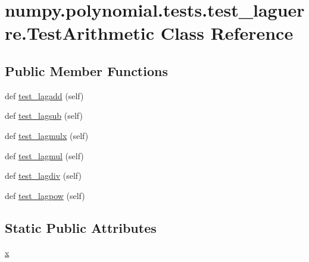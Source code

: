\hypertarget{classnumpy_1_1polynomial_1_1tests_1_1test__laguerre_1_1TestArithmetic}{}\section{numpy.\+polynomial.\+tests.\+test\+\_\+laguerre.\+Test\+Arithmetic Class Reference}
\label{classnumpy_1_1polynomial_1_1tests_1_1test__laguerre_1_1TestArithmetic}
\subsection*{Public Member Functions}
\begin{DoxyCompactItemize}
\item 
def \hyperlink{classnumpy_1_1polynomial_1_1tests_1_1test__laguerre_1_1TestArithmetic_a499d7c08f043feaa65e71d9d5eb79030}{test\+\_\+lagadd} (self)
\item 
def \hyperlink{classnumpy_1_1polynomial_1_1tests_1_1test__laguerre_1_1TestArithmetic_a4da112921fdf5dfeb3b8eac253398828}{test\+\_\+lagsub} (self)
\item 
def \hyperlink{classnumpy_1_1polynomial_1_1tests_1_1test__laguerre_1_1TestArithmetic_ac43c6891eacb7f5766445cecfbceec3a}{test\+\_\+lagmulx} (self)
\item 
def \hyperlink{classnumpy_1_1polynomial_1_1tests_1_1test__laguerre_1_1TestArithmetic_a7ea492123485b8c50786ea662e7d1cc3}{test\+\_\+lagmul} (self)
\item 
def \hyperlink{classnumpy_1_1polynomial_1_1tests_1_1test__laguerre_1_1TestArithmetic_a60ae1992c6d661e180ee00eb498366de}{test\+\_\+lagdiv} (self)
\item 
def \hyperlink{classnumpy_1_1polynomial_1_1tests_1_1test__laguerre_1_1TestArithmetic_a5eca847146d4e5c483dd0cbfb2685c4f}{test\+\_\+lagpow} (self)
\end{DoxyCompactItemize}
\subsection*{Static Public Attributes}
\begin{DoxyCompactItemize}
\item 
\hyperlink{classnumpy_1_1polynomial_1_1tests_1_1test__laguerre_1_1TestArithmetic_ac7c8e9a8d393b9bb0480492e9d14bda5}{x}
\end{DoxyCompactItemize}


